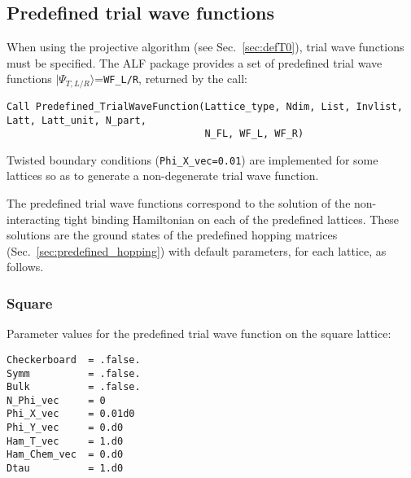 

\subsection{Predefined trial wave functions} \label{sec:predefined_trial_wave_function}

When using the projective algorithm (see Sec.~\ref{sec:defT0}), trial wave functions must be specified.
The ALF package provides a set of predefined trial wave functions $|\Psi_{T,L/R}\rangle$=\texttt{WF\_L/R}, returned by the call:

\begin{lstlisting}[style=fortran]
Call Predefined_TrialWaveFunction(Lattice_type, Ndim, List, Invlist, Latt, Latt_unit, N_part,
                                  N_FL, WF_L, WF_R)
\end{lstlisting}
Twisted boundary conditions (\texttt{Phi\_X\_vec=0.01}) are implemented for some lattices so as to generate a non-degenerate trial wave function.

The predefined trial wave functions correspond to the solution of the non-interacting tight binding Hamiltonian on each of the predefined lattices. These solutions are the ground states of the predefined hopping matrices (Sec.~\ref{sec:predefined_hopping}) with default parameters, for each lattice, as follows.

\subsubsection{Square}

Parameter values for the predefined trial wave function on the square lattice:
\begin{lstlisting}[style=fortran]
Checkerboard  = .false.
Symm          = .false.
Bulk          = .false.
N_Phi_vec     = 0
Phi_X_vec     = 0.01d0
Phi_Y_vec     = 0.d0
Ham_T_vec     = 1.d0
Ham_Chem_vec  = 0.d0
Dtau          = 1.d0
\end{lstlisting}


